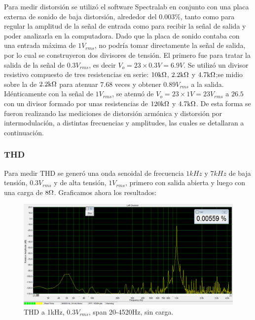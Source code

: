 Para medir distorsión se utilizó el software Spectralab en conjunto con una placa externa de sonido de baja distorsión, alrededor del $0.003\%$, tanto como para regular la amplitud de la señal de entrada como para recibir la señal de salida y poder analizarla en la computadora.
Dado que la placa de sonido contaba con una entrada máxima de $1V_{rms}$, no podría tomar directamente la señal de salida, por lo cual se construyeron dos divisores de tensión. El primero fue para tratar la salida de la señal de $0.3V_{rms}$, es decir $V_o=23 \times 0.3V=6.9V$. Se utilizó un divisor resistivo compuesto de tres resistencias en serie: $10\kohm$, $2.2\kohm$ y $4.7\kohm$;se midio sobre la de $2.2\kohm$ para atenuar 7.68 veces y obtener $0.89V_{rms}$ a la salida. Idénticamente con la señal de $1V_{rms}$, se atenuó de $V_o=23\times1V=23V_{rms}$ a $26.5$ con un divisor formado por unas resistencias de $120\kohm$ y  $4.7\kohm$.
De esta forma se fueron realizando las mediciones de distorsión armónica y distorsión por intermodulación, a distintas frecuencias y amplitudes, las cuales se detallaran a continuación.

\subsubsection*{THD}

Para medir THD se generó una onda senoidal de frecuencia $1kHz$ y $7kHz$ de baja tensión, $0.3V_{rms}$ y de alta tensión, $1V_{rms}$, primero con salida abierta y luego con una carga de $8\ohm$. Graficamos ahora los resultados:

\begin{figure}[H]
\centering
\includegraphics[width=\textwidth]{img/Distorsion/THD_1k_03V_span_20_4520.png}
\caption{THD a 1kHz, $0.3V_{rms}$, span 20-4520Hz, sin carga.}
\label{THD1} 
\end{figure}


